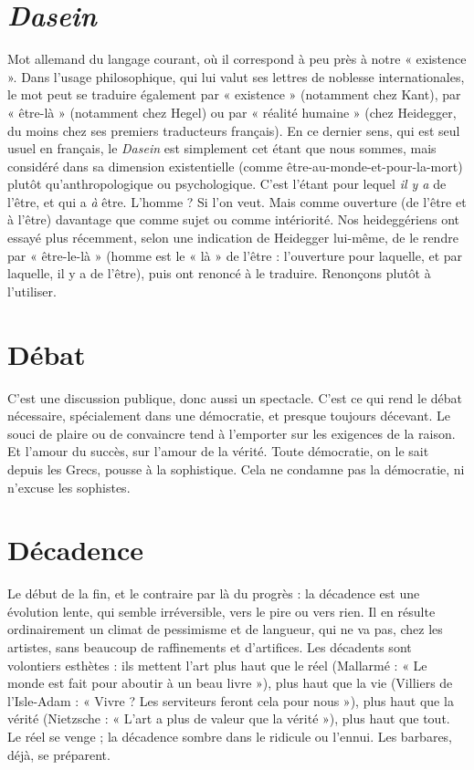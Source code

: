 \section{\it Dasein}
Mot allemand du langage courant, où il correspond à peu près à
notre « existence ». Dans l’usage philosophique, qui lui valut ses
lettres de noblesse internationales, le mot peut se traduire également par
« existence » (notamment chez Kant), par « être-là » (notamment chez Hegel)
ou par « réalité humaine » (chez Heidegger, du moins chez ses premiers traducteurs
français). En ce dernier sens, qui est seul usuel en français, le {\it Dasein} est
simplement cet étant que nous sommes, mais considéré dans sa dimension existentielle
(comme être-au-monde-et-pour-la-mort) plutôt qu’anthropologique
ou psychologique. C’est l’étant pour lequel {\it il y a} de l'être, et qui a {\it à} être.
L'homme ? Si l’on veut. Mais comme ouverture (de l’être et à l’être) davantage
que comme sujet ou comme intériorité. Nos heideggériens ont essayé plus
récemment, selon une indication de Heidegger lui-même, de le rendre par
« être-le-là » (homme est le « là » de l'être : l'ouverture pour laquelle, et par
laquelle, il y a de l'être), puis ont renoncé à le traduire. Renonçons plutôt à
l'utiliser.

\section{Débat}
C'est une discussion publique, donc aussi un spectacle. C’est ce qui
rend le débat nécessaire, spécialement dans une démocratie, et
presque toujours décevant. Le souci de plaire ou de convaincre tend à
l'emporter sur les exigences de la raison. Et l’amour du succès, sur l’amour de
la vérité. Toute démocratie, on le sait depuis les Grecs, pousse à la sophistique.
Cela ne condamne pas la démocratie, ni n’excuse les sophistes.

\section{Décadence}
Le début de la fin, et le contraire par là du progrès : la décadence
est une évolution lente, qui semble irréversible, vers
le pire ou vers rien. Il en résulte ordinairement un climat de pessimisme et de
langueur, qui ne va pas, chez les artistes, sans beaucoup de raffinements et
d’artifices. Les décadents sont volontiers esthètes : ils mettent l’art plus haut
que le réel (Mallarmé : « Le monde est fait pour aboutir à un beau livre »), plus
haut que la vie (Villiers de l’Isle-Adam : « Vivre ? Les serviteurs feront cela pour
nous »), plus haut que la vérité (Nietzsche : « L'art a plus de valeur que la
vérité »), plus haut que tout. Le réel se venge ; la décadence sombre dans le ridicule
ou l’ennui. Les barbares, déjà, se préparent.


